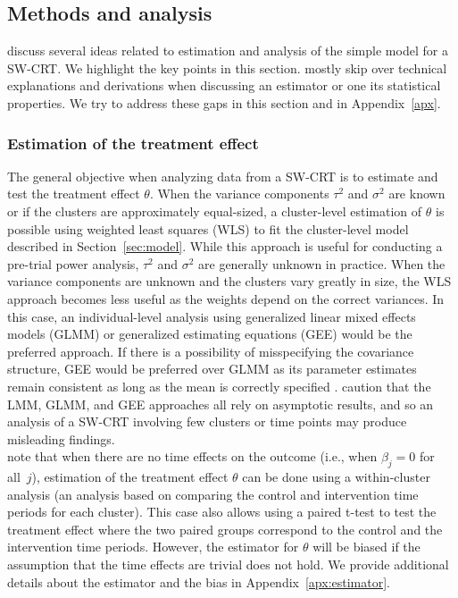 \documentclass[10pt]{article}
\begin{document}
\subsection{Methods and analysis}

\textcite{Hussey:2007} discuss several ideas related to estimation and analysis of the simple model for a SW-CRT. We highlight the key points in this section. \citeauthor{Hussey:2007} mostly skip over technical explanations and derivations when discussing an estimator or one its statistical properties. We try to address these gaps in this section and in Appendix~\ref{apx}.

\subsubsection{Estimation of the treatment effect}

The general objective when analyzing data from a SW-CRT is to estimate and test the treatment effect $\theta$. When the variance components $\tau^2$ and $\sigma^2$ are known or if the clusters are approximately equal-sized, a cluster-level estimation of $\theta$ is possible using weighted least squares (WLS) to fit the cluster-level model described in Section~\ref{sec:model}. While this approach is useful for conducting a pre-trial power analysis, $\tau^2$ and $\sigma^2$ are generally unknown in practice. When the variance components are unknown and the clusters vary greatly in size, the WLS approach becomes less useful as the weights depend on the correct variances. In this case, an individual-level analysis using generalized linear mixed effects models (GLMM) or generalized estimating equations (GEE) would be the preferred approach. If there is a possibility of misspecifying the covariance structure, GEE would be preferred over GLMM as its parameter estimates remain consistent as long as the mean is correctly specified \parencite{Diggle:2002}. \textcite{Hussey:2007} caution that the LMM, GLMM, and GEE approaches all rely on asymptotic results, and so an analysis of a SW-CRT involving few clusters or time points may produce misleading findings.
\\

\citeauthor{Hussey:2007} note that when there are no time effects on the outcome (i.e., when $\beta_j=0$ for all~$j$), estimation of the treatment effect $\theta$ can be done using a within-cluster analysis (an analysis based on comparing the control and intervention time periods for each cluster). This case also allows using a paired t-test to test the treatment effect where the two paired groups correspond to the control and the intervention time periods. However, the estimator for $\theta$ will be biased if the assumption that the time effects are trivial does not hold. We provide additional details about the estimator and the bias in Appendix~\ref{apx:estimator}.
\\
\end{document}

